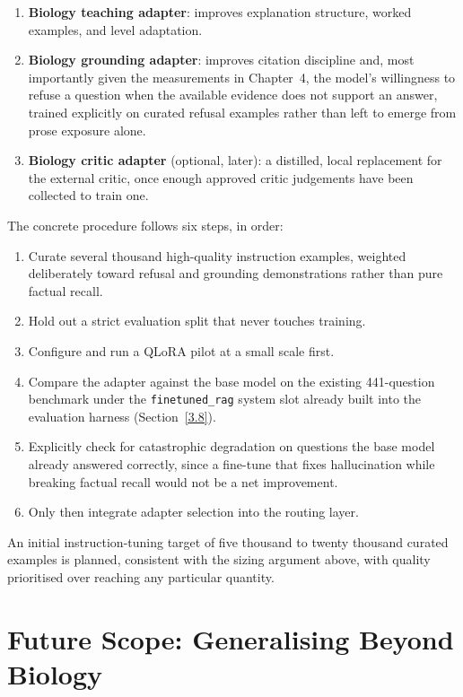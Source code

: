 \begin{enumerate}
    \item \textbf{Biology teaching adapter}: improves explanation
        structure, worked examples, and level adaptation.
    \item \textbf{Biology grounding adapter}: improves citation
        discipline and, most importantly given the measurements in
        Chapter~4, the model's willingness to refuse a question when the
        available evidence does not support an answer, trained explicitly
        on curated refusal examples rather than left to emerge from prose
        exposure alone.
    \item \textbf{Biology critic adapter} (optional, later): a
        distilled, local replacement for the external critic, once enough
        approved critic judgements have been collected to train one.
\end{enumerate}

The concrete procedure follows six steps, in order:

\begin{enumerate}
    \item Curate several thousand high-quality instruction examples,
        weighted deliberately toward refusal and grounding demonstrations
        rather than pure factual recall.
    \item Hold out a strict evaluation split that never touches training.
    \item Configure and run a QLoRA pilot at a small scale first.
    \item Compare the adapter against the base model on the existing
        441-question benchmark under the \texttt{finetuned\_rag} system
        slot already built into the evaluation harness (Section~\ref{3.8}).
    \item Explicitly check for catastrophic degradation on questions the
        base model already answered correctly, since a fine-tune that
        fixes hallucination while breaking factual recall would not be a
        net improvement.
    \item Only then integrate adapter selection into the routing layer.
\end{enumerate}

An initial instruction-tuning target of five thousand to twenty thousand
curated examples is planned, consistent with the sizing argument above,
with quality prioritised over reaching any particular quantity.

\section{Future Scope: Generalising Beyond Biology}\label{5.4}

